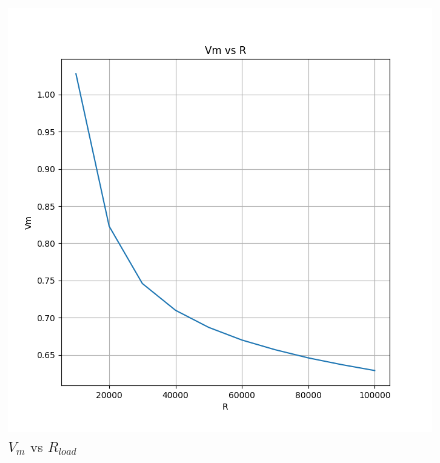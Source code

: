 \documentclass{article}
\begin{document}
\begin{figure}[!ht]
    \centering
    \includegraphics[scale=0.5]{Images/5b_Vm.png}
    \caption{$V_m$ vs $R_{load}$}
\end{figure}
\end{document}
